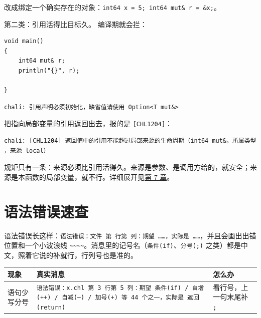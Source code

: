 改成绑定一个确实存在的对象：\texttt{int64 x =\allowbreak{} 5; int64 mut\& r =\allowbreak{} \&x;}。

第二类：引用活得比目标久。 编译期就会拦：

\par
\medskip
\begin{lstlisting}[style=chali]
void main()
{
    int64 mut& r;
    println("{}", r);

}
\end{lstlisting}
\par
\medskip

\par
\medskip
\begin{lstlisting}[style=out]
chali: 引用声明必须初始化，缺省值请使用 Option<T mut&>
\end{lstlisting}
\par
\medskip

把指向局部变量的引用返回出去，报的是 \texttt{[\allowbreak{}CHL1204]\allowbreak{}}：

\par
\medskip
\begin{lstlisting}[style=out]
chali: [CHL1204] 返回值中的引用不能超过局部来源的生命周期（int64 mut&，所属类型 ，来源 local）
\end{lstlisting}
\par
\medskip

规矩只有一条：来源必须比引用活得久。来源是参数、是调用方给的，就安全；来源是本函数的局部变量，就不行。详细展开见\hyperref[ch:07]{第 7 章}。

\section{语法错误速查}

语法错误长这样：\texttt{语法错误：文件 第 行第 列：期望 ……，实际是 ……}，并且会画出出错位置和一个小波浪线 \texttt{\textasciitilde{}\textasciitilde{}\textasciitilde{}\textasciitilde{}}。消息里的记号名（\texttt{条件(\allowbreak{}if)\allowbreak{}}、\texttt{分号(\allowbreak{};)\allowbreak{}} 之类）都是中文，照着它说的补就行，行列号也是准的。

{\small\setlength{\tabcolsep}{4pt}
\begin{longtable}{>{\raggedright\arraybackslash}p{}>{\raggedright\arraybackslash}p{}>{\raggedright\arraybackslash}p{}}
\toprule
现象 & 真实消息 & 怎么办 \\
\midrule
\endhead
语句少写分号 & \texttt{语法错误：x.\allowbreak{}chl 第 3 行第 5 列：期望 条件(\allowbreak{}if)\allowbreak{} /\allowbreak{} 自增(\allowbreak{}++)\allowbreak{} /\allowbreak{} 自减(\allowbreak{}--)\allowbreak{} /\allowbreak{} 加号(\allowbreak{}+)\allowbreak{} 等 44 个之一，实际是 返回(\allowbreak{}return)\allowbreak{}} & 看行号，上一句末尾补 \texttt{;} \\
\bottomrule
\end{longtable}
}

